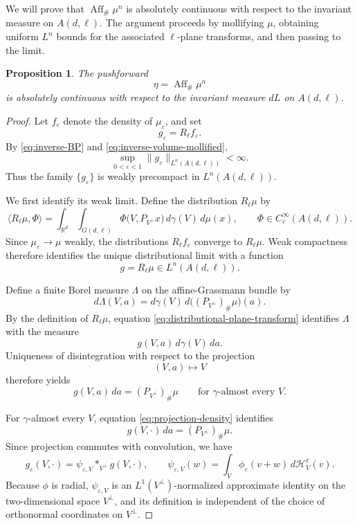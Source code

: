 \documentclass[11pt]{article}
\newtheorem{proposition}[theorem]{Proposition}
\theoremstyle{remark}
\newcommand{\R}{\mathbb R}
\newcommand{\cH}{\mathcal H}
\newcommand{\eps}{\varepsilon}
\numberwithin{equation}{section}
\newcommand{\1}{\mathbf 1}
\begin{document}
We will prove that \(\operatorname{Aff}_\#\mu^n\) is absolutely continuous
with respect to the invariant measure on \(A(d,\ell)\). The argument
proceeds by mollifying \(\mu\), obtaining uniform \(L^n\) bounds for the
associated \(\ell\)-plane transforms, and then passing to the limit.

\begin{proposition}
\label{prop:hull-ac}
The pushforward
\[
\eta=\operatorname{Aff}_\#\mu^n
\]
is absolutely continuous with respect to the invariant measure \(dL\)
on \(A(d,\ell)\).
\end{proposition}



\begin{proof}
Let \(f_\eps\) denote the density of \(\mu_\eps\), and set
\[
g_\eps=R_\ell f_\eps.
\]
By \eqref{eq:inverse-BP} and
\eqref{eq:inverse-volume-mollified},
\[
\sup_{0<\eps<1}
\|g_\eps\|_{L^n(A(d,\ell))}
<\infty.
\]
Thus the family \(\{g_\eps\}\) is weakly precompact in
\(L^n(A(d,\ell))\).

We first identify its weak limit.  Define the distribution \(R_\ell\mu\)
by
\begin{equation}
\langle R_\ell\mu,\Phi\rangle
=
\int_{\R^d}
\int_{G(d,\ell)}
\Phi\bigl(V,P_{V^\perp}x\bigr)\,
d\gamma(V)\,d\mu(x),
\qquad
\Phi\in C_c^\infty(A(d,\ell)).
\label{eq:distributional-plane-transform}
\end{equation}
Since \(\mu_\eps\to\mu\) weakly, the distributions \(R_\ell f_\eps\)
converge to \(R_\ell\mu\). Weak compactness therefore identifies the unique distributional limit
with a function
\[
g=R_\ell\mu\in L^n(A(d,\ell)).
\]

Define a finite Borel measure \(\Lambda\) on the affine-Grassmann bundle
by
\[
d\Lambda(V,a)
=
d\gamma(V)\,
d\bigl((P_{V^\perp})_\#\mu\bigr)(a).
\]
By the definition of \(R_\ell\mu\), equation
\eqref{eq:distributional-plane-transform} identifies \(\Lambda\) with
the measure
\[
g(V,a)\,d\gamma(V)\,da.
\]
Uniqueness of disintegration with respect to the projection
\[
(V,a)\longmapsto V
\]
therefore yields
\begin{equation}
g(V,a)\,da
=
(P_{V^\perp})_\#\mu
\qquad
\text{for \(\gamma\)-almost every \(V\)}.
\label{eq:projection-density}
\end{equation}  

For \(\gamma\)-almost every \(V\), equation
\eqref{eq:projection-density} identifies
\[
g(V,\cdot)\,da=(P_{V^\perp})_\#\mu.
\]
Since projection commutes with convolution, we have
\begin{equation}
g_\eps(V,\cdot)
=
\psi_{\eps,V}*_{V^\perp}g(V,\cdot),
\qquad
\psi_{\eps,V}(w)
=
\int_V \phi_\eps(v+w)\,d\cH_V^\ell(v).
\label{eq:fiber-convolution}
\end{equation}
Because \(\phi\) is radial, \(\psi_{\eps,V}\) is an
\(L^1(V^\perp)\)-normalized approximate identity on the
two-dimensional space \(V^\perp\), and its definition is independent
of the choice of orthonormal coordinates on \(V^\perp\).


\end{proof}
\end{document}
